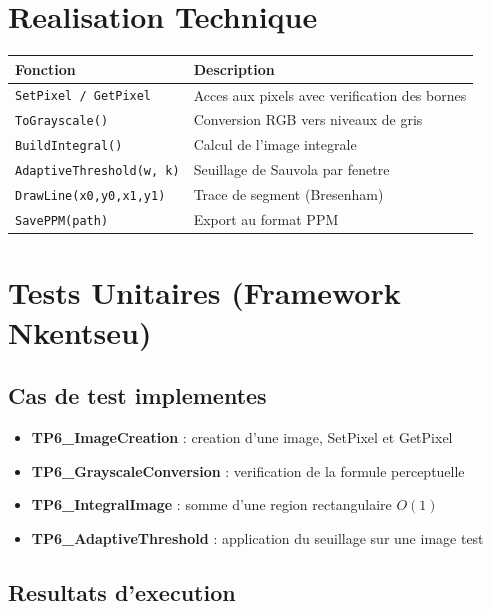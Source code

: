 \documentclass[12pt,a4paper]{article}
\begin{document}
\section{Realisation Technique}

\begin{center}
\begin{tabular}{ll}
    \toprule
    \textbf{Fonction} & \textbf{Description} \\
    \midrule
    \texttt{SetPixel / GetPixel} & Acces aux pixels avec verification des bornes \\
    \texttt{ToGrayscale()} & Conversion RGB vers niveaux de gris \\
    \texttt{BuildIntegral()} & Calcul de l'image integrale \\
    \texttt{AdaptiveThreshold(w, k)} & Seuillage de Sauvola par fenetre \\
    \texttt{DrawLine(x0,y0,x1,y1)} & Trace de segment (Bresenham) \\
    \texttt{SavePPM(path)} & Export au format PPM \\
    \bottomrule
\end{tabular}
\end{center}

\section{Tests Unitaires (Framework Nkentseu)}

\subsection{Cas de test implementes}

\begin{itemize}
    \item \textbf{TP6\_ImageCreation} : creation d'une image, SetPixel et GetPixel
    \item \textbf{TP6\_GrayscaleConversion} : verification de la formule perceptuelle
    \item \textbf{TP6\_IntegralImage} : somme d'une region rectangulaire $O(1)$
    \item \textbf{TP6\_AdaptiveThreshold} : application du seuillage sur une image test
\end{itemize}

\subsection{Resultats d'execution}
\end{document}
